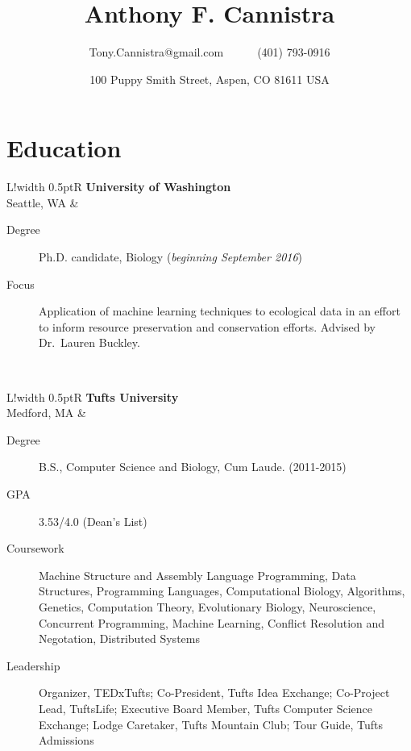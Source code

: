 \documentclass[10pt, letter]{article}
\title{\vspace{-80pt}\bfseries Anthony F. Cannistra\vspace{-10pt}}
\author{Tony.Cannistra@gmail.com~~~~~~(401) 793-0916}
\date{\vspace{-6pt}\small{
100 Puppy Smith Street, Aspen, CO 81611 USA
\vspace{-20pt}
}
}
\newcommand\VRule{\color{lightgray}\vrule width 0.5pt}
\begin{document}
\maketitle
\thispagestyle{empty}

\section*{Education}

\begin{tabular}{L!{\VRule}R}
\textbf{University of Washington} \\ Seattle, WA &
\vspace{-16.7pt}
\begin{description}
\item [Degree] Ph.D. candidate, Biology (\emph{beginning September 2016})
\item [Focus] Application of machine learning techniques to ecological data in an effort to inform resource preservation and conservation efforts. Advised by Dr.~Lauren Buckley.
\end{description} \\

\end{tabular}
\begin{tabular}{L!{\VRule}R}
\textbf{Tufts University} \\ Medford, MA &
\vspace{-16.7pt}
\begin{description}
\item[Degree] B.S., Computer Science and Biology, Cum Laude. (2011-2015)
\item[GPA] 3.53/4.0 (Dean's List)
\item[Coursework] Machine Structure and Assembly Language Programming, Data Structures, Programming Languages, Computational Biology, Algorithms, Genetics, Computation Theory, Evolutionary Biology, Neuroscience, Concurrent Programming, Machine Learning, Conflict Resolution and Negotation, Distributed Systems
\item[Leadership] Organizer, TEDxTufts; Co-President, Tufts Idea Exchange; Co-Project Lead, TuftsLife; Executive Board Member, Tufts Computer Science Exchange; Lodge Caretaker, Tufts Mountain Club; Tour Guide, Tufts Admissions
\end{description} \\


\end{tabular}
\end{document}
